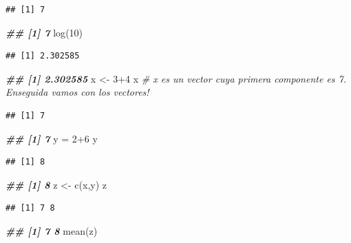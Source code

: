 \documentclass[
]{book}
\newenvironment{Shaded}{\begin{snugshade}}{\end{snugshade}}
\newcommand{\CommentTok}[1]{\textcolor[rgb]{0.56,0.35,0.01}{\textit{#1}}}
\newcommand{\DecValTok}[1]{\textcolor[rgb]{0.00,0.00,0.81}{#1}}
\newcommand{\DocumentationTok}[1]{\textcolor[rgb]{0.56,0.35,0.01}{\textbf{\textit{#1}}}}
\newcommand{\FunctionTok}[1]{\textcolor[rgb]{0.00,0.00,0.00}{#1}}
\newcommand{\NormalTok}[1]{#1}
\newcommand{\OtherTok}[1]{\textcolor[rgb]{0.56,0.35,0.01}{#1}}
\newcommand{\SpecialCharTok}[1]{\textcolor[rgb]{0.00,0.00,0.00}{#1}}
\begin{document}
\begin{verbatim}
## [1] 7
\end{verbatim}

\begin{Shaded}
\begin{Highlighting}[]
\DocumentationTok{\#\# [1] 7}
\FunctionTok{log}\NormalTok{(}\DecValTok{10}\NormalTok{)}
\end{Highlighting}
\end{Shaded}

\begin{verbatim}
## [1] 2.302585
\end{verbatim}

\begin{Shaded}
\begin{Highlighting}[]
\DocumentationTok{\#\# [1] 2.302585}
\NormalTok{x }\OtherTok{\textless{}{-}} \DecValTok{3}\SpecialCharTok{+}\DecValTok{4}  
\NormalTok{x  }\CommentTok{\# x es un vector cuya primera componente es 7. Enseguida vamos con los vectores!}
\end{Highlighting}
\end{Shaded}

\begin{verbatim}
## [1] 7
\end{verbatim}

\begin{Shaded}
\begin{Highlighting}[]
\DocumentationTok{\#\# [1] 7}
\NormalTok{y }\OtherTok{=} \DecValTok{2}\SpecialCharTok{+}\DecValTok{6}
\NormalTok{y}
\end{Highlighting}
\end{Shaded}

\begin{verbatim}
## [1] 8
\end{verbatim}

\begin{Shaded}
\begin{Highlighting}[]
\DocumentationTok{\#\# [1] 8}
\NormalTok{z }\OtherTok{\textless{}{-}} \FunctionTok{c}\NormalTok{(x,y)}
\NormalTok{z}
\end{Highlighting}
\end{Shaded}

\begin{verbatim}
## [1] 7 8
\end{verbatim}

\begin{Shaded}
\begin{Highlighting}[]
\DocumentationTok{\#\# [1] 7 8}
\FunctionTok{mean}\NormalTok{(z)}
\end{Highlighting}
\end{Shaded}
\end{document}
